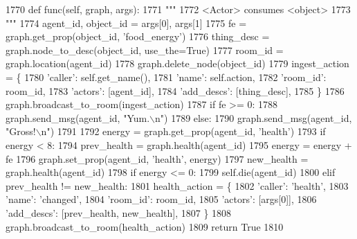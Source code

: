\begin{DoxyCode}
1770     \textcolor{keyword}{def }func(self, graph, args):
1771         \textcolor{stringliteral}{"""}
1772 \textcolor{stringliteral}{        <Actor> consumes <object>}
1773 \textcolor{stringliteral}{        """}
1774         agent\_id, object\_id = args[0], args[1]
1775         fe = graph.get\_prop(object\_id, \textcolor{stringliteral}{'food\_energy'})
1776         thing\_desc = graph.node\_to\_desc(object\_id, use\_the=\textcolor{keyword}{True})
1777         room\_id = graph.location(agent\_id)
1778         graph.delete\_node(object\_id)
1779         ingest\_action = \{
1780             \textcolor{stringliteral}{'caller'}: self.get\_name(),
1781             \textcolor{stringliteral}{'name'}: self.action,
1782             \textcolor{stringliteral}{'room\_id'}: room\_id,
1783             \textcolor{stringliteral}{'actors'}: [agent\_id],
1784             \textcolor{stringliteral}{'add\_descs'}: [thing\_desc],
1785         \}
1786         graph.broadcast\_to\_room(ingest\_action)
1787         \textcolor{keywordflow}{if} fe >= 0:
1788             graph.send\_msg(agent\_id, \textcolor{stringliteral}{"Yum.\(\backslash\)n"})
1789         \textcolor{keywordflow}{else}:
1790             graph.send\_msg(agent\_id, \textcolor{stringliteral}{"Gross!\(\backslash\)n"})
1791 
1792         energy = graph.get\_prop(agent\_id, \textcolor{stringliteral}{'health'})
1793         \textcolor{keywordflow}{if} energy < 8:
1794             prev\_health = graph.health(agent\_id)
1795             energy = energy + fe
1796             graph.set\_prop(agent\_id, \textcolor{stringliteral}{'health'}, energy)
1797             new\_health = graph.health(agent\_id)
1798             \textcolor{keywordflow}{if} energy <= 0:
1799                 self.die(agent\_id)
1800             \textcolor{keywordflow}{elif} prev\_health != new\_health:
1801                 health\_action = \{
1802                     \textcolor{stringliteral}{'caller'}: \textcolor{stringliteral}{'health'},
1803                     \textcolor{stringliteral}{'name'}: \textcolor{stringliteral}{'changed'},
1804                     \textcolor{stringliteral}{'room\_id'}: room\_id,
1805                     \textcolor{stringliteral}{'actors'}: [args[0]],
1806                     \textcolor{stringliteral}{'add\_descs'}: [prev\_health, new\_health],
1807                 \}
1808                 graph.broadcast\_to\_room(health\_action)
1809         \textcolor{keywordflow}{return} \textcolor{keyword}{True}
1810 
\end{DoxyCode}
\mbox{\label{classlight__chats_1_1graph_1_1IngestFunction_aae6cb9fc171d5a59c3d2bafae9ed58b7}} 
